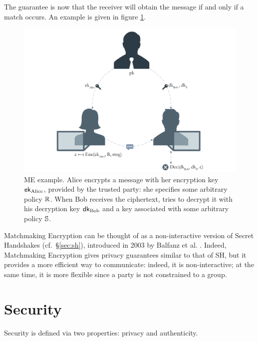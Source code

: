 The guarantee is now that the receiver will obtain the message if and only if a match occurs.
An example is given in figure \ref{fig:me_example}.
\begin{figure}[ht]
    \centering
    \includegraphics[width=\linewidth]{images/me.png}
    \caption{ME example. Alice encrypts a message with her encryption key $\mathsf{ek}_{\mathrm{Alice}}$, provided by the trusted party: she specifies some arbitrary policy $\mathbb{R}$. When Bob receives the ciphertext, tries to decrypt it with his decryption key $\mathsf{dk}_{\mathrm{Bob}}$ and a key associated with some arbitrary policy $\mathbb{S}$.}
    \label{fig:me_example}
\end{figure}
\newline\newline
Matchmaking Encryption can be thought of as a non-interactive version of Secret Handshakes (cf.\ \S\ref{sec:sh}), introduced in 2003 by Balfanz et al. \cite{Balfanz}.
Indeed, Matchmaking Encryption gives privacy guarantees similar to that of SH, but it provides a more efficient way to communicate: indeed, it is non-interactive; at the same time, it is more flexible since a party is not constrained to a group.

\section{Security}
Security is defined via two properties: privacy and authenticity.

